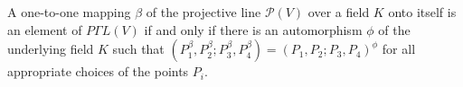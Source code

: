 A one-to-one mapping $\beta$ of the projective line $\mathcal{P}(V)$ over a field $K$ onto itself is an element of $P\Gamma L(V)$ if and only if there is an automorphism $\phi$ of the underlying field $K$ such that $(P_1^\beta, P_2^\beta; P_3^\beta, P_4^\beta) = (P_1, P_2; P_3, P_4)^\phi$ for all appropriate choices of the points $P_i$.